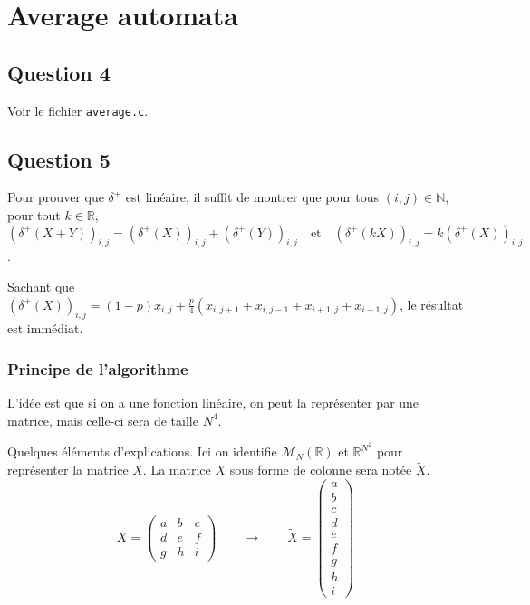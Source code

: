 \documentclass{article}
\begin{document}
\section{Average automata}

\subsection*{Question 4} 

Voir le fichier \texttt{average.c}.

\subsection*{Question 5}

Pour prouver que $\delta^+$ est linéaire, il suffit de montrer que pour tous $(i,j) \in \mathbb{N}$, pour tout $k \in \mathbb{R}$, 
$$(\delta^+(X+Y))_{i,j} = (\delta^+(X))_{i,j} + (\delta^+(Y))_{i,j} \quad \text{et} \quad (\delta^+(kX))_{i,j} = k(\delta^+(X))_{i,j}$$.

Sachant que $(\delta^+(X))_{i,j} = (1-p)x_{i,j} + \frac{p}{4} \left(x_{i,j+1} + x_{i,j-1} + x_{i+1,j} + x_{i-1,j}\right)$, le résultat est immédiat.

\subsubsection*{Principe de l'algorithme}

L'idée est que si on a une fonction linéaire, on peut la représenter par une matrice, mais celle-ci sera de taille $N^4$.

Quelques éléments d'explications. Ici on identifie $\mathcal{M}_N(\mathbb{R})$ et $\mathbb{R}^{N^2}$ pour représenter la matrice $X$. La matrice $X$ sous forme de colonne sera notée $\tilde{X}$. \\

$$ X = \begin{pmatrix} a & b & c \\ d & e & f \\ g & h & i \end{pmatrix} \qquad \longrightarrow \qquad \tilde{X} = \left( \begin{array}{c} a \\ b \\ c \\ d \\ e \\ f \\ g \\ h \\ i \end{array} \right)$$
\end{document}

